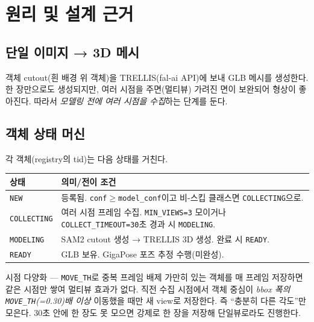 \begin{statuswip}\end{statuswip}

\chapter{원리 및 설계 근거}

\section{단일 이미지 → 3D 메시}
객체 cutout(흰 배경 위 객체)을 TRELLIS(fal-ai API)에 보내 GLB 메시를 생성한다.
한 장만으로도 생성되지만, 여러 시점을 주면(멀티뷰) 가려진 면이 보완되어 형상이
좋아진다. 따라서 \emph{모델링 전에 여러 시점을 수집}하는 단계를 둔다.

\section{객체 상태 머신}
각 객체(registry의 tid)는 다음 상태를 거친다.
\begin{center}
\begin{tabular}{@{}lp{9cm}@{}}
\toprule
상태 & 의미/전이 조건 \\
\midrule
\texttt{NEW}        & 등록됨. \texttt{conf}$\ge$\texttt{model\_conf}이고 비-스킵
                      클래스면 \texttt{COLLECTING}으로. \\
\texttt{COLLECTING} & 여러 시점 프레임 수집. \texttt{MIN\_VIEWS=3} 모이거나
                      \texttt{COLLECT\_TIMEOUT=30}초 경과 시 \texttt{MODELING}. \\
\texttt{MODELING}   & SAM2 cutout 생성 → TRELLIS 3D 생성. 완료 시 \texttt{READY}. \\
\texttt{READY}      & GLB 보유. GigaPose 포즈 추정 수행(미완성). \\
\bottomrule
\end{tabular}
\end{center}

\begin{designbox}{시점 다양화 — \texttt{MOVE\_TH}로 중복 프레임 배제}
가만히 있는 객체를 매 프레임 저장하면 같은 시점만 쌓여 멀티뷰 효과가 없다.
직전 수집 시점에서 객체 중심이 \emph{bbox 폭의 \texttt{MOVE\_TH}(=0.30)배 이상}
이동했을 때만 새 view로 저장한다. 즉 ``충분히 다른 각도''만 모은다. 30초 안에
한 장도 못 모으면 강제로 한 장을 저장해 단일뷰로라도 진행한다.
\end{designbox}

